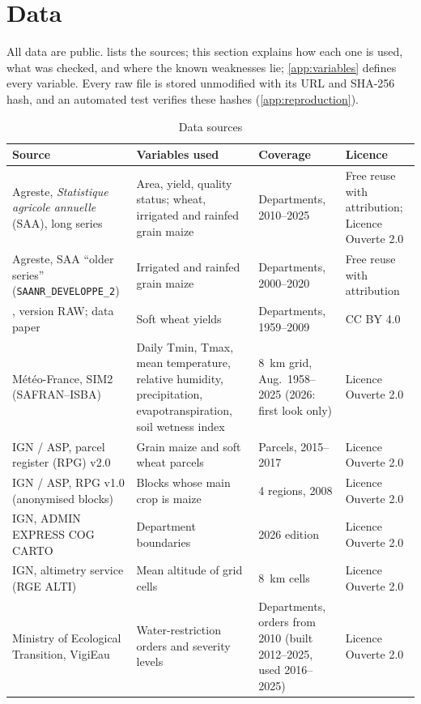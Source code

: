 \section{Data}
\label{sec:data}

All data are public.  lists the sources; this section explains how each one is used, what was checked, and where the known weaknesses lie; \cref{app:variables} defines every variable. Every raw file is stored unmodified with its URL and SHA-256 hash, and an automated test verifies these hashes (\cref{app:reproduction}).

\begin{table}[tp]
\centering
\scriptsize
\caption{Data sources}
\label{tab:sources}
\begin{tabular}{>{\raggedright}p{4.4cm}>{\raggedright}p{4.3cm}>{\raggedright}p{2.6cm}>{\raggedright\arraybackslash}p{2.6cm}}
\toprule
Source & Variables used & Coverage & Licence \\
\midrule
Agreste, \emph{Statistique agricole annuelle} (SAA), long series & Area, yield, quality status; wheat, irrigated and rainfed grain maize & Departments, 2010--2025 & Free reuse with attribution; Licence Ouverte 2.0 \\
Agreste, SAA ``older series'' (\texttt{SAANR\_DEVELOPPE\_2}) & Irrigated and rainfed grain maize & Departments, 2000--2020 & Free reuse with attribution \\
\textcite{schauberger2021data}, version RAW; data paper \textcite{schauberger2022} & Soft wheat yields & Departments, 1959--2009 & CC BY 4.0 \\
Météo-France, SIM2 (SAFRAN--ISBA) & Daily Tmin, Tmax, mean temperature, relative humidity, precipitation, evapotranspiration, soil wetness index & 8~km grid, Aug.~1958--2025 (2026: first look only) & Licence Ouverte 2.0 \\
IGN / ASP, parcel register (RPG) v2.0 & Grain maize and soft wheat parcels & Parcels, 2015--2017 & Licence Ouverte 2.0 \\
IGN / ASP, RPG v1.0 (anonymised blocks) & Blocks whose main crop is maize & 4 regions, 2008 & Licence Ouverte 2.0 \\
IGN, ADMIN EXPRESS COG CARTO & Department boundaries & 2026 edition & Licence Ouverte 2.0 \\
IGN, altimetry service (RGE ALTI) & Mean altitude of grid cells & 8~km cells & Licence Ouverte 2.0 \\
Ministry of Ecological Transition, VigiEau & Water-restriction orders and severity levels & Departments, orders from 2010 (built 2012--2025, used 2016--2025) & Licence Ouverte 2.0 \\

\end{tabular}
\end{table}
